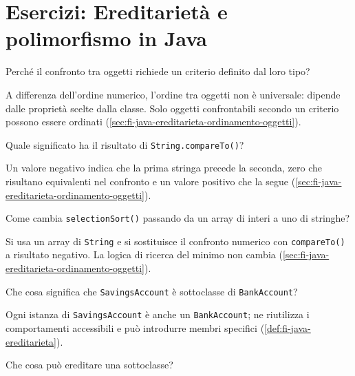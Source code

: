 \chapter{Esercizi: Ereditarietà e polimorfismo in Java}
\label{chap:esercizi-ereditarieta-polimorfismo-java}

\begin{exercise}
\label{ex:fi-esercizi-java-ereditarieta-ordinamento-confronto}
Perché il confronto tra oggetti richiede un criterio definito dal loro tipo?
\end{exercise}

A differenza dell’ordine numerico, l’ordine tra oggetti non è universale:
dipende dalle proprietà scelte dalla classe. Solo oggetti confrontabili
secondo un criterio possono essere ordinati
(\cref{sec:fi-java-ereditarieta-ordinamento-oggetti}).

\begin{exercise}
\label{ex:fi-esercizi-java-ereditarieta-compareto}
Quale significato ha il risultato di \texttt{String.compareTo()}?
\end{exercise}

Un valore negativo indica che la prima stringa precede la seconda, zero che
risultano equivalenti nel confronto e un valore positivo che la segue
(\cref{sec:fi-java-ereditarieta-ordinamento-oggetti}).

\begin{exercise}
\label{ex:fi-esercizi-java-ereditarieta-selection-stringhe}
Come cambia \texttt{selectionSort()} passando da un array di interi a uno di
stringhe?
\end{exercise}

Si usa un array di \texttt{String} e si sostituisce il confronto numerico
con \texttt{compareTo()} a risultato negativo. La logica di ricerca del
minimo non cambia (\cref{sec:fi-java-ereditarieta-ordinamento-oggetti}).

\begin{exercise}
\label{ex:fi-esercizi-java-ereditarieta-subclass}
Che cosa significa che \texttt{SavingsAccount} è sottoclasse di
\texttt{BankAccount}?
\end{exercise}

Ogni istanza di \texttt{SavingsAccount} è anche un \texttt{BankAccount}; ne
riutilizza i comportamenti accessibili e può introdurre membri specifici
(\cref{def:fi-java-ereditarieta}).

\begin{exercise}
\label{ex:fi-esercizi-java-ereditarieta-eredita}
Che cosa può ereditare una sottoclasse?
\end{exercise}

